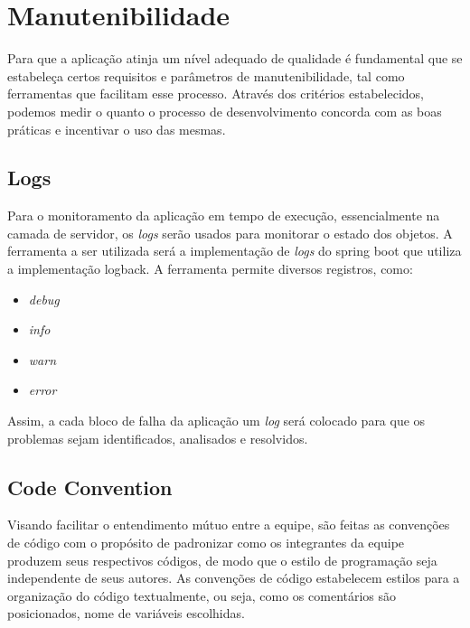 \section{Manutenibilidade}
Para que a aplicação atinja um nível adequado de qualidade é fundamental
que se estabeleça certos requisitos e parâmetros de manutenibilidade, tal como
ferramentas que facilitam esse processo. Através dos critérios estabelecidos, podemos
medir o quanto o processo de desenvolvimento concorda com as boas práticas e incentivar o uso das mesmas.

\subsection{Logs}
Para o monitoramento da aplicação em tempo de execução, essencialmente na camada de servidor,
os \emph{logs} serão usados para monitorar o estado dos objetos. A ferramenta a ser utilizada
será a implementação de \emph{logs} do \gls{spring boot} que utiliza a implementação \gls{logback}.
A ferramenta permite diversos registros, como:

\begin{itemize}
    \item \emph{debug} 
    \item \emph{info}
    \item \emph{warn} 
    \item \emph{error}
\end{itemize}

Assim, a cada bloco de falha da aplicação um \emph{log} será colocado para que os problemas sejam identificados,
analisados e resolvidos.

\subsection{Code Convention}
Visando facilitar o entendimento mútuo entre a equipe, são feitas as convenções de código com o propósito de padronizar como os integrantes da equipe produzem seus respectivos códigos, de modo que o estilo de programação seja independente de seus autores.
As convenções de código estabelecem estilos para a organização do código textualmente, ou seja, como os comentários são posicionados, nome de variáveis escolhidas.

